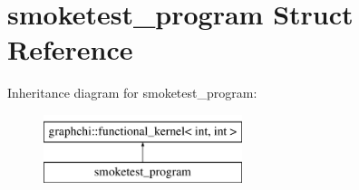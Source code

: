 \hypertarget{structsmoketest__program}{\section{smoketest\-\_\-program Struct Reference}
\label{structsmoketest__program}
}
Inheritance diagram for smoketest\-\_\-program\-:\begin{figure}[H]
\begin{center}
\leavevmode
\includegraphics[height=2.000000cm]{structsmoketest__program}
\end{center}
\end{figure}
